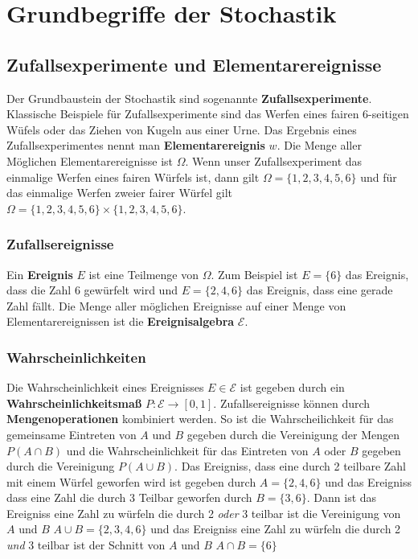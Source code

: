 \section{Grundbegriffe der Stochastik}

\subsection*{Zufallsexperimente und Elementarereignisse}
Der Grundbaustein der Stochastik sind sogenannte \textbf{Zufallsexperimente}. Klassische Beispiele für Zufallsexperimente sind das Werfen eines fairen 6-seitigen Wüfels oder das Ziehen von Kugeln aus einer Urne. Das Ergebnis eines Zufallsexperimentes nennt man \textbf{Elementarereignis} $w$. Die Menge aller Möglichen Elementarereignisse ist $\Omega$. Wenn unser Zufallsexperiment das einmalige Werfen eines fairen Würfels ist, dann gilt $\Omega = \{1, 2, 3, 4, 5, 6\}$ und für das einmalige Werfen zweier fairer Würfel gilt $\Omega = \{1,2,3,4,5,6\} \times \{1,2,3,4,5,6\} $. 

\subsubsection*{Zufallsereignisse}
Ein \textbf{Ereignis} $E$ ist eine Teilmenge von $\Omega$. Zum Beispiel ist $E =\{6\}$ das Ereignis, dass die Zahl 6 gewürfelt wird und $E=\{2,4,6\}$ das Ereignis, dass eine gerade Zahl fällt. Die Menge aller möglichen Ereignisse auf einer Menge von Elementarereignissen ist die \textbf{Ereignisalgebra} $\mathcal{E}$.

\subsubsection*{Wahrscheinlichkeiten}
Die Wahrscheinlichkeit eines Ereignisses $E \in \mathcal{E}$ ist gegeben durch ein \textbf{Wahrscheinlichkeitsmaß} $P: \mathcal{E}\rightarrow [0,1]$. Zufallsereignisse können durch \textbf{Mengenoperationen} kombiniert werden. So ist die Wahrscheilichkeit für das gemeinsame Eintreten von $A$ und $B$ gegeben durch die Vereinigung der Mengen $P(A \cap B)$ und die Wahrscheinlichkeit für das Eintreten von $A$ oder $B$ gegeben durch die Vereinigung $P(A \cup B)$. Das Ereigniss, dass eine durch 2 teilbare Zahl mit einem Würfel geworfen wird ist gegeben durch $A=\{2,4,6\}$ und das Ereigniss dass eine Zahl die durch 3 Teilbar geworfen durch $B=\{3,6\}$. Dann ist das Ereigniss eine Zahl zu würfeln die durch 2 \textit{oder} 3 teilbar ist die Vereinigung von $A$ und $B$ $A \cup B = \{2,3,4,6\}$ und das Ereigniss eine Zahl zu würfeln die durch 2 \textit{und} 3 teilbar ist der Schnitt von $A$ und $B$ $A \cap B = \{6\}$

